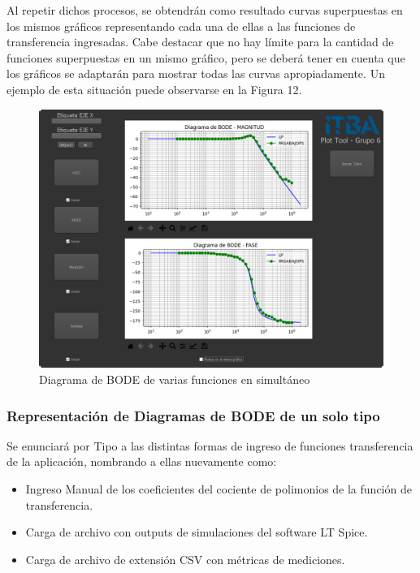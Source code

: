 Al repetir dichos procesos, se obtendrán como resultado curvas superpuestas en los mismos gráficos representando cada una de ellas a las funciones de transferencia ingresadas. 
Cabe destacar que no hay límite para la cantidad de funciones superpuestas en un mismo gráfico, pero se deberá tener en cuenta que los gráficos se adaptarán para mostrar todas las curvas apropiadamente.
Un ejemplo de esta situación puede observarse en la Figura 12.

\begin{figure}[!htb] 
    \centering 
    \includegraphics [width=0.8
    \textwidth] {../EJ2/LatexScreenshots/plotToolMulti.png} 
    \caption{Diagrama de BODE de varias funciones en simultáneo}
    \label{fig:multiPlotTool}
\end{figure}

\subsubsection{Representación de Diagramas de BODE de un solo tipo}

Se enunciará por Tipo a las distintas formas de ingreso de funciones transferencia de la aplicación, nombrando a ellas nuevamente como:

\begin{itemize}
    \item Ingreso Manual de los coeficientes del cociente de polimonios de la función de transferencia.
    \item Carga de archivo con outputs de simulaciones del software LT Spice.
    \item Carga de archivo de extensión CSV con métricas de mediciones. 

\end{itemize}

